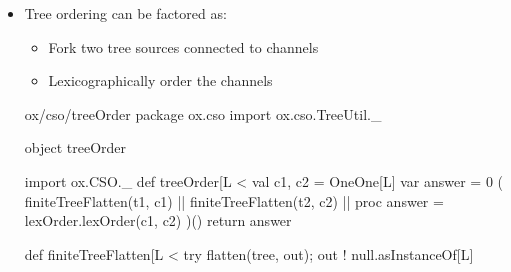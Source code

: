 \documentclass{concdistfoils}
\begin{document}
\begin{slide}
\begin{itemize}
\item Tree ordering can be factored as:
\begin{smaller}
\begin{itemize}
\item Fork two tree sources connected to channels
\item Lexicographically order the channels
\end{itemize}
\end{smaller}
\vfill
\begin{obj}{ox/cso/treeOrder}
package ox.cso
import  ox.cso.TreeUtil._

object treeOrder
{ import  ox.CSO._
  def treeOrder[L <%
  { val c1, c2 = OneOne[L]
    var answer = 0   
    (  finiteTreeFlatten(t1, c1)
    || finiteTreeFlatten(t2, c2) 
    || proc { answer = lexOrder.lexOrder(c1, c2) }
    )()
    return answer
  }
    
  def finiteTreeFlatten[L <%
  { try { flatten(tree, out); out ! null.asInstanceOf[L] } }
}
\end{obj}
\end{itemize}
\end{slide}
\end{document}

